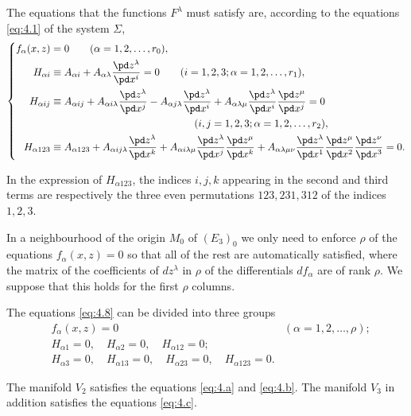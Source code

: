 The equations that the functions $F^{\lambda}$ must satisfy are, according to the equations \eqref{eq:4.1} of the system $\Sigma$,
\begin{equation}
  \label{eq:4.8}
  \left\{
    \begin{aligned}
      f_{\alpha}(x,z)&=0\qquad(\alpha=1,2,\dots,r_{0}),\\
      H_{\alpha i}&\equiv A_{\alpha i}+A_{\alpha \lambda}\frac{\pd z^{\lambda}}{\pd x^{i}}=0\qquad(i=1,2,3;\alpha=1,2,\dots,r_{1}),\\
      H_{\alpha ij}&\equiv A_{\alpha ij}+A_{\alpha i\lambda}\frac{\pd z^{\lambda}}{\pd x^{j}}-A_{\alpha j\lambda}\frac{\pd z^{\lambda}}{\pd x^{i}}+A_{\alpha \lambda \mu}\frac{\pd z^{\lambda}}{\pd x^{i}}\frac{\pd z^{\mu}}{\pd x^{j}}=0\\
      &\qquad\qquad\qquad\qquad\qquad\qquad\qquad(i,j=1,2,3;\alpha=1,2,\dots,r_{2}),\\
H_{\alpha 123}&\equiv A_{\alpha 123}+A_{\alpha ij\lambda}\frac{\pd z^{\lambda}}{\pd x^{k}}+A_{\alpha i \lambda\mu}\frac{\pd z^{\lambda}}{\pd x^{j}}\frac{\pd z^{\mu}}{\pd x^{k}}+A_{\alpha\lambda\mu\nu}\frac{\pd z^{\lambda}}{\pd x^{1}}\frac{\pd z^{\mu}}{\pd x^{2}}\frac{\pd z^{\nu}}{\pd x^{3}}=0.
    \end{aligned}
  \right.
\end{equation}

In the expression of $H_{\alpha 123}$, the indices $i,j,k$  appearing in the second and third terms are respectively the three even permutations $123,231,312$ of the indices $1,2,3$.

In a neighbourhood of the origin $M_{0}$ of $(E_{3})_{0}$ we  only need to enforce $\rho$ of the equations $f_{\alpha}(x,z)=0$ so that all of the rest are automatically satisfied, where the matrix of the coefficients of $dz^{\lambda}$ in  $\rho$ of the differentials $df_{\alpha}$ are of rank $\rho$. We suppose that this holds for the first $\rho$ columns.

The equations \eqref{eq:4.8} can be divided into three groups
\begin{align}
\label{eq:4.a}&f_{\alpha}(x,z)=0&(\alpha=1,2,\dots,\rho);\tag{A}\\
\label{eq:4.b}&H_{\alpha1}=0,\quad H_{\alpha 2}=0,\quad H_{\alpha 12}=0;\tag{B}\\
\label{eq:4.c}&H_{\alpha 3}=0,\quad H_{\alpha 13}=0,\quad H_{\alpha23}=0,\quad H_{\alpha 123}=0.\tag{C}
\end{align}

The manifold $V_{2}$ satisfies the equations \eqref{eq:4.a} and \eqref{eq:4.b}. The manifold $V_{3}$ in addition satisfies the equations \eqref{eq:4.c}.

